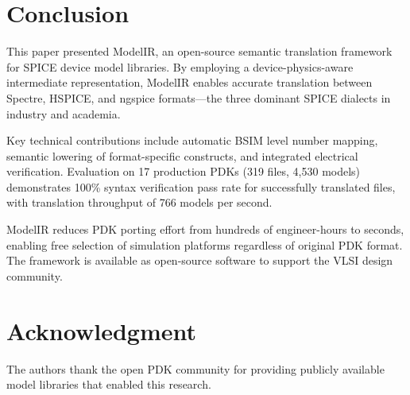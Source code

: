 \documentclass[conference]{IEEEtran}
\begin{document}
\section{Conclusion}
\label{sec:conclusion}

This paper presented ModelIR, an open-source semantic translation framework for SPICE device model libraries. By employing a device-physics-aware intermediate representation, ModelIR enables accurate translation between Spectre, HSPICE, and ngspice formats---the three dominant SPICE dialects in industry and academia.

Key technical contributions include automatic BSIM level number mapping, semantic lowering of format-specific constructs, and integrated electrical verification. Evaluation on 17 production PDKs (319 files, 4,530 models) demonstrates 100\% syntax verification pass rate for successfully translated files, with translation throughput of 766 models per second.

ModelIR reduces PDK porting effort from hundreds of engineer-hours to seconds, enabling free selection of simulation platforms regardless of original PDK format. The framework is available as open-source software to support the VLSI design community.

\section*{Acknowledgment}

The authors thank the open PDK community for providing publicly available model libraries that enabled this research.
\end{document}
